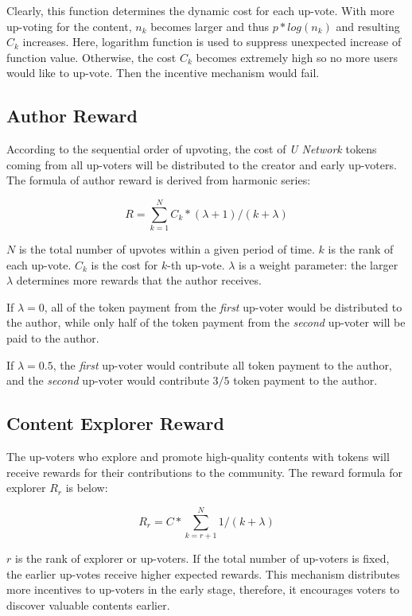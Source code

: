 Clearly, this function determines the dynamic cost for each up-vote.  With more up-voting for the content, $n_k$ becomes larger and thus $p * log(n_k)$ and resulting $C_k$ increases.  Here, logarithm function is used to suppress unexpected increase of function value. Otherwise, the cost $C_k$ becomes extremely high so no more users would like to up-vote. Then the incentive mechanism would fail.

\subsection{Author Reward}
According to the sequential order of upvoting, the cost of \emph{U Network} tokens coming from all up-voters will be distributed to the creator and early up-voters. The formula of author reward is derived from harmonic series: 
\begin{center}
$$R = \sum_{k=1}^{N}  C_{k} * (\lambda + 1)/{(k + \lambda)}$$
\end{center}
$N$ is the total number of upvotes within a given period of time. $k$ is the rank of each up-vote. $C_{k}$ is the cost for $k$-th up-vote. $\lambda$ is a weight parameter: the larger $\lambda$ determines more rewards that the author receives. 

If $\lambda = 0$, all of the token payment from the \emph{first} up-voter would be distributed to the author, while only half of the token payment from the \emph{second} up-voter will be paid to the author. 

If $\lambda = 0.5$, the \emph{first} up-voter would contribute all token payment to the author, and the \emph{second} up-voter would contribute $3/5$ token payment to the author. 


\subsection{Content Explorer Reward}
The up-voters who explore and promote high-quality contents with tokens will receive rewards for their contributions to the community. The reward formula for explorer $R_r$ is below:
\begin{center}
$$R_r = C * \sum_{k=r+1}^{N} 1/{(k + \lambda)}$$
\end{center}
$r$ is the rank of explorer or up-voters. If the total number of up-voters is fixed, the earlier up-votes receive higher expected rewards. This mechanism distributes more incentives to up-voters in the early stage, therefore, it encourages voters to discover valuable contents earlier.
 
